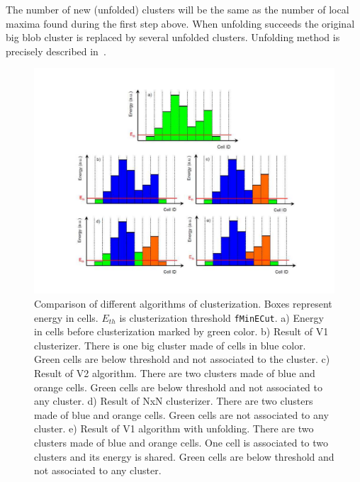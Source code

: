 The number of new (unfolded) clusters will be the same as the number of local maxima found during the first step above. When unfolding succeeds the original big blob cluster is replaced by several unfolded clusters. Unfolding method is precisely described in~\cite{unfolding_note}.
%
\begin{figure}[!h]
\begin{center}
\includegraphics[scale=0.4]{figures/clusters}
\caption{Comparison of different algorithms of clusterization. Boxes represent energy in cells. $E_{th}$ is clusterization threshold \texttt{fMinECut}. a) Energy in cells before clusterization marked by green color. b) Result of V1 clusterizer. There is one big cluster made of cells in blue color. Green cells are below threshold and not associated to the cluster. c) Result of V2 algorithm. There are two clusters made of blue and orange cells. Green cells are below threshold and not associated to any cluster. d) Result of NxN clusterizer. There are two clusters made of blue and orange cells. Green cells are not associated to any cluster. e) Result of V1 algorithm with unfolding. There are two clusters made of blue and orange cells. One cell is associated to two clusters and its energy is shared. Green cells are below threshold and not associated to any cluster. }
\label{fig:clusterizers}
\end{center}
\end{figure}

